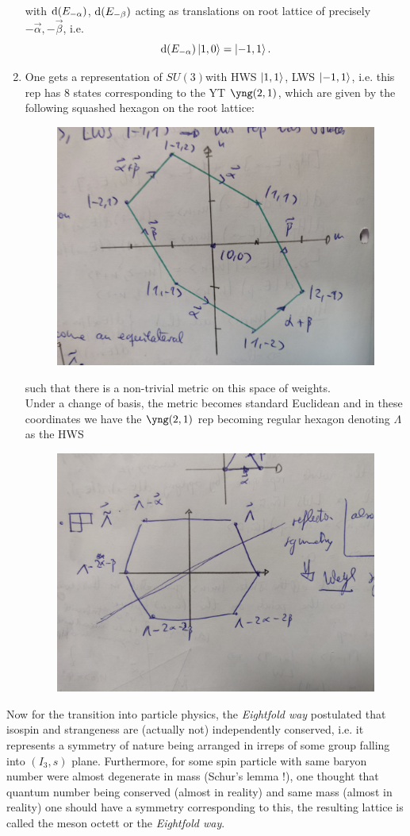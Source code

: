 \begin{enumerate}
with $\mathrm{d}(E_{-\alpha})$, $\mathrm{d}(E_{-\beta})$ acting as translations on root lattice of precisely $-\vec{\alpha},-\vec{\beta}$, i.e.
\begin{equation*}
\mathrm{d}(E_{-\alpha}) \ket{1,0} = \ket{-1,1}.
\end{equation*}
\item One gets a representation of $SU(3)$with HWS $\ket{1,1}$, LWS $\ket{-1,1}$, i.e. this rep has $8$ states corresponding to the YT $\yng(2,1)$, which are given by the following squashed hexagon on the root lattice:
\begin{figure}[h!]
	\centering
	\includegraphics[width=0.5\linewidth]{gfx/squashedhexagon}
	\caption{}
	\label{fig:squashedhexagon}
\end{figure}
such that there is a non-trivial metric on this space of weights.
\\
Under a change of basis, the metric becomes standard Euclidean and in these coordinates we have the $\yng(2,1)$ rep becoming regular hexagon denoting $\Lambda$ as the HWS
\begin{figure}[h!]
	\centering
	\includegraphics[width=0.5\linewidth]{gfx/weylsymmetrygroups}
	\caption{}
	\label{fig:weylsymmetrygroups}
\end{figure}
\end{enumerate}
Now for the transition into particle physics, the \emph{Eightfold way} postulated that isospin and strangeness are (actually not) independently conserved, i.e. it represents a symmetry of nature being arranged in irreps of some group falling into $(I_3,s)$ plane. Furthermore, for some spin particle with same baryon number were almost degenerate in mass (Schur's lemma !), one thought that quantum number being conserved (almost in reality) and same mass (almost in reality) one should have a symmetry corresponding to this, the resulting lattice is called the meson octett or the \emph{Eightfold way}.\\
